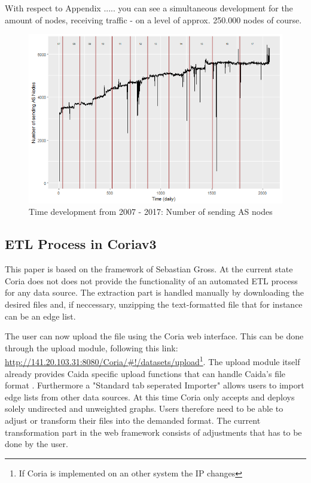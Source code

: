 \documentclass[conference, 11pt]{IEEEtran}
\begin{document}
With respect to Appendix .....  you can see a simultaneous development for the amount of nodes, receiving traffic - on a level of approx. 250.000 nodes of course. 

\vspace{0.5cm}
\begin{figure}[htbp]
\centerline{\includegraphics[scale=0.4]{Graphics/ASFromAll.png}}
\caption{Time development from 2007 - 2017: Number of sending AS nodes}
\label{fig}
\end{figure}
\vspace{0.5cm}



\subsection{ETL Process in Coriav3}

This paper is based on the framework of Sebastian Gross\cite{Coria3}. At the current state Coria does not does not provide the functionality of an automated ETL process for any data source. 
The extraction part is handled manually by downloading the desired files and, if neccessary, unzipping the text-formatted file that for instance can be an edge list. \break


The user can now upload the file using the Coria web interface. This can be done through the upload module, following this link: \url{http://141.20.103.31:8080/Coria/#!/datasets/upload}\footnote{If Coria is implemented on an other system the IP changes}. The upload module itself already provides Caida specific upload functions that can handle Caida's file format \cite{Coria3}. Furthermore a "Standard tab seperated Importer" allows users to import edge lists from other data sources. At this time Coria only accepts and deploys solely undirected and unweighted graphs. Users therefore need to be able to adjust or transform their files into the demanded format. The current transformation part in the web framework consists of adjustments that has to be done by the user.\linebreak
\end{document}
